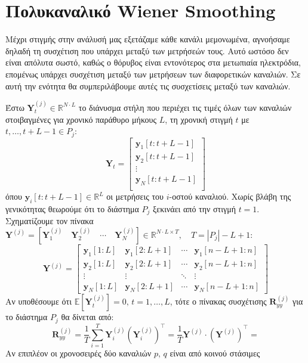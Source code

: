 \documentclass[a4paper,12pt]{article}
\begin{document}
\section*{Πολυκαναλικό Wiener Smoothing}
Μέχρι στιγμής στην ανάλυσή μας εξετάζαμε κάθε κανάλι μεμονωμένα, αγνοήσαμε δηλαδή τη συσχέτιση που υπάρχει
μεταξύ των μετρήσεών τους. Αυτό ωστόσο δεν είναι απόλυτα σωστό, καθώς ο θόρυβος είναι εντονότερος στα μετωπιαία
ηλεκτρόδια, επομένως υπάρχει συσχέτιση μεταξύ των μετρήσεων των διαφορετικών καναλιών. Σε αυτή την ενότητα θα
συμπεριλάβουμε αυτές τις συσχετίσεις μεταξύ των καναλιών.

Έστω $\mathbf{Y}_t^{(j)} \in \mathbb{R}^{N\cdot L}$ το διάνυσμα στήλη που περιέχει τις τιμές όλων των καναλιών
στοιβαγμένες για χρονικό παράθυρο μήκους $L$, τη χρονική στιγμή $t$ με $t,\ldots, t+L-1 \in P_j$:
\[
\mathbf{Y}_t = 
\begin{bmatrix}
    \mathbf{y}_1[t:t+L-1] \\
    \mathbf{y}_2[t:t+L-1] \\
    \vdots \\
    \mathbf{y}_N[t:t+L-1] \\
\end{bmatrix}
\]
όπου $\mathbf{y}_i[t:t+L-1] \in \mathbb{R}^L$ οι μετρήσεις του $i$-οστού καναλιού. Χωρίς βλάβη της γενικότητας
θεωρούμε ότι το διάστημα $P_j$ ξεκινάει από την στιγμή $t=1$. Σχηματίζουμε τον πίνακα 
$\mathbf{Y}^{(j)} = [\mathbf{Y}_1^{(j)} \quad \mathbf{Y}_2^{(j)} \quad \cdots \quad \mathbf{Y}_N^{(j)}] 
\in \mathbb{R}^{N \cdot L \times T}, \quad T = |P_j| - L + 1$:
\[
\mathbf{Y}^{(j)} = 
\begin{bmatrix}
    \mathbf{y}_1[1:L] & \mathbf{y}_1[2:L+1] & \cdots & \mathbf{y}_1[n-L+1:n] \\
    \mathbf{y}_2[1:L] & \mathbf{y}_2[2:L+1] & \cdots & \mathbf{y}_2[n-L+1:n] \\
    \vdots & \vdots & \ddots & \vdots \\
    \mathbf{y}_N[1:L] & \mathbf{y}_N[2:L+1] & \cdots & \mathbf{y}_N[n-L+1:n]
\end{bmatrix}
\]
Αν υποθέσουμε ότι $\mathbb{E}[\mathbf{Y}_t^{(j)}] = 0, \, t=1,\ldots,L$, τότε ο πίνακας συσχέτισης 
$\mathbf{R}_{yy}^{(j)}$ για το διάστημα $P_j$ θα δίνεται από:
\[
\mathbf{R}_{yy}^{(j)} = 
\frac{1}{T} \sum_{i=1}^T \mathbf{Y}_i^{(j)} \left(\mathbf{Y}_i^{(j)}\right)^{\top} = 
\frac{1}{T} \mathbf{Y}^{(j)} \cdot \left(\mathbf{Y}^{(j)}\right)^{\top} = 
\]
Αν επιπλέον οι χρονοσειρές δύο καναλιών $p,\,q$ είναι από κοινού στάσιμες 
\end{document}
